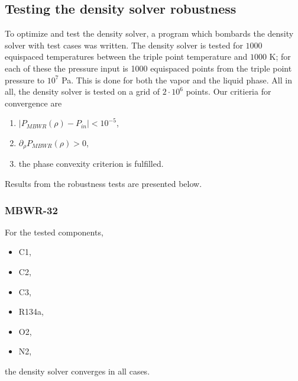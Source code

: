 \documentclass[internal,english]{sintefmemo2012}
\numberwithin{equation}{section}
\begin{document}
\subsection{Testing the density solver robustness}
To optimize and test the density solver, a program which bombards the
density solver with test cases was written. The density solver is
tested for $1000$ equispaced temperatures between the triple point
temperature and $1000$ K; for each of these the pressure input is 1000
equispaced points from the triple point pressure to $10^7$ Pa. This is
done for both the vapor and the liquid phase. All in
all, the density solver is tested on a grid of $2 \cdot 10^6$
points. Our critieria for convergence are
\begin{enumerate}
\item $|P_{MBWR}(\rho)-P_{in}| < 10^{-5}$,
\item $\partial_\rho P_{MBWR}(\rho)> 0$,
\item the phase convexity criterion is fulfilled.
\end{enumerate}
Results from the robustness tests are presented below.

\subsubsection*{MBWR-32}
For the tested components,
\begin{itemize}
\item C1,
\item C2,
\item C3,
\item R134a,
\item O2,
\item N2,
\end{itemize}
the density solver converges in all cases.
\end{document}
